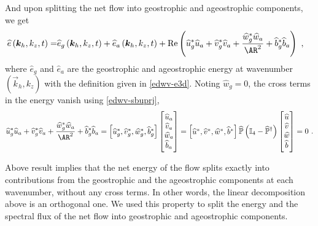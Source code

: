 \documentclass[../Rajarshi-thesis-draft.tex]{subfiles}
\begin{document}
And upon splitting the net flow into geostrophic and ageostrophic components, we get 
\begin{align}
 \begin{split}
 \hat{e}\left( \vec{k}_h, k_z,t \right) =& \hat{e}_g\left( \vec{k}_h, k_z,t \right) + \hat{e}_a\left( \vec{k}_h, k_z,t \right)+ \op{Re}\left( \hat{u}_g^* \hat u_a + \hat{v}_g^* \hat v_a + \frac{\hat{w}_g^* \hat w_a}{\AR^2} + \hat{b}_g^* \hat b_a\right) \ , 
 \end{split}
\end{align}
where $\hat{e}_g$ and $\hat{e}_a$ are the geostrophic and ageostrophic energy at wavenumber $(\vec{k}_h, k_z)$ with the definition given in \eqref{edwv-e3d}. Noting $\hat{w}_g = 0$, the cross terms in the energy vanish using \eqref{edwv-sbuprj}, 
\begin{align}
 \begin{split}
 \hat{u}_g^* \hat u_a + \hat{v}_g^* \hat v_a + \frac{\hat{w}_g^* \hat w_a}{\AR^2} + \hat{b}_g^* \hat b_a = \begin{bmatrix}
 \hat{u}_g^*,\hat{v}_g^*,\hat{w}_g^*, \hat{b}_g^*
 \end{bmatrix} \begin{bmatrix}
 \hat{u}_a \\
 \hat{v}_a \\
 \hat{w}_a \\
 \hat{b}_a \\
 \end{bmatrix} = \begin{bmatrix}
 \hat{u}^*,\hat{v}^*,\hat{w}^*, \hat{b}^*
 \end{bmatrix}\hat{\mb{P}} \left(\mb{I}_4 - \hat{\mb{P}}^\dagger\right) \begin{bmatrix}
 \hat{u} \\
 \hat{v} \\
 \hat{w} \\
 \hat{b} \\
 \end{bmatrix} = 0 \ .
 \end{split}
\end{align}

Above result implies that the net energy of the flow  splits exactly into contributions  from the geostrophic and the ageostrophic components at each wavenumber, without any cross terms. In other words, the linear decomposition above is an orthogonal one. We used this property to split the energy and the spectral flux of the net flow into geostrophic and ageostrophic components.
\end{document}
